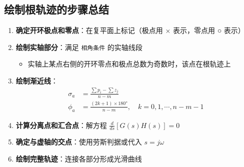 \subsection{绘制根轨迹的步骤总结}

\begin{enumerate}
    \item \textbf{确定开环极点和零点}：在复平面上标记（极点用 × 表示，零点用 ○ 表示）
    
    \item \textbf{绘制实轴部分}：满足 \texttt{相角条件} 的实轴线段
    \begin{itemize}
        \item 实轴上某点右侧的开环零点和极点总数为奇数时，该点在根轨迹上
    \end{itemize}
    
    \item \textbf{绘制渐近线}：
    \begin{align*}
    \sigma_a &= \frac{\sum p_i - \sum z_j}{n-m} \\
    \phi_a &= \frac{(2k+1) \times 180°}{n-m}, \quad k=0,1,\cdots,n-m-1
    \end{align*}
    
    \item \textbf{计算分离点和汇合点}：解方程 $\frac{d}{ds}[G(s)H(s)] = 0$
    
    \item \textbf{确定与虚轴的交点}：使用劳斯判据或代入 $s=j\omega$
    
    \item \textbf{绘制完整轨迹}：连接各部分形成光滑曲线
\end{enumerate}

